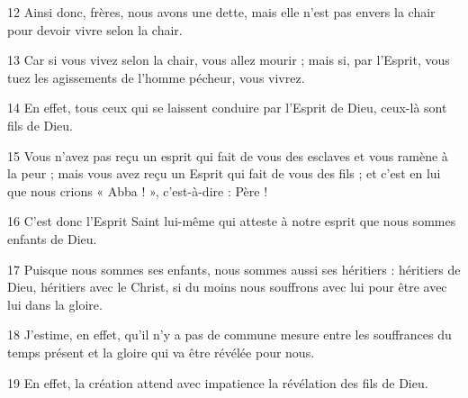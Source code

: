 12 Ainsi donc, frères, nous avons une dette, mais elle n’est pas envers la chair pour devoir vivre selon la chair.

13 Car si vous vivez selon la chair, vous allez mourir ; mais si, par l’Esprit, vous tuez les agissements de l’homme pécheur, vous vivrez.

14 En effet, tous ceux qui se laissent conduire par l’Esprit de Dieu, ceux-là sont fils de Dieu.

15 Vous n’avez pas reçu un esprit qui fait de vous des esclaves et vous ramène à la peur ; mais vous avez reçu un Esprit qui fait de vous des fils ; et c’est en lui que nous crions « Abba ! », c’est-à-dire : Père !

16 C’est donc l’Esprit Saint lui-même qui atteste à notre esprit que nous sommes enfants de Dieu.

17 Puisque nous sommes ses enfants, nous sommes aussi ses héritiers : héritiers de Dieu, héritiers avec le Christ, si du moins nous souffrons avec lui pour être avec lui dans la gloire.

18 J’estime, en effet, qu’il n’y a pas de commune mesure entre les souffrances du temps présent et la gloire qui va être révélée pour nous.

19 En effet, la création attend avec impatience la révélation des fils de Dieu.